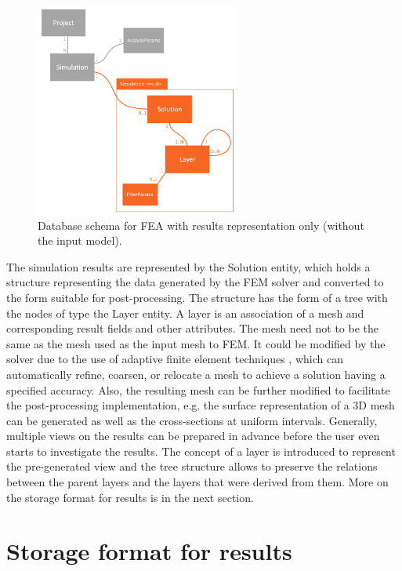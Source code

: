 \begin{figure}[H]
    \centering
    \includegraphics[width=0.6\textwidth]{figures/chapter-data-management/FEA-database-schema-only-results}
    \decoRule
    \caption{Database schema for FEA with results representation only (without the input model).}
    \label{fig:FEA-db-schema-results}
\end{figure}

The simulation results are represented by the Solution entity, which holds a structure representing the data generated by the FEM solver and converted to the form suitable for post-processing. The structure has the form of a tree with the nodes of type the Layer entity. A layer is an association of a mesh and corresponding result fields and other attributes. The mesh need not to be the same as the mesh used as the input mesh to FEM. It could be modified by the solver due to the use of adaptive finite element techniques \cite{XXX}, which can automatically refine, coarsen, or relocate a mesh to achieve a solution having a specified accuracy. Also, the resulting mesh can be further modified to facilitate the post-processing implementation, e.g. the surface representation of a 3D mesh can be generated as well as the cross-sections at uniform intervals. Generally, multiple views on the results can be prepared in advance before the user even starts to investigate the results. The concept of a layer is introduced to represent the pre-generated view and the tree structure allows to preserve the relations between the parent layers and the layers that were derived from them. More on the storage format for results is in the next section.


\section{Storage format for results}
\label{sec:storage-format}

